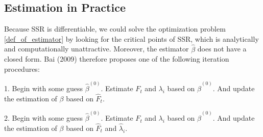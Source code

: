 \documentclass[a4paper]{article}
\begin{document}
\subsection{Estimation in Practice}

 Because SSR is differentiable, we could solve the optimization problem \eqref{def_of_estimator} by looking for the critical points of SSR, which is analytically and computationally unattractive. Moreover, the estimator $\hat \beta$ does not have a closed form. Bai (2009) therefore proposes one of the following iteration procedures:

1. Begin with some guess $\hat \beta^{(0)}$. Estimate $F_t$ and $\lambda_i$ based on $\hat \beta^{(0)}$. And update the estimation of $\beta$ based on $\hat F_t$.

2. Begin with some guess $\hat \beta^{(0)}$. Estimate $F_t$ and $\lambda_i$ based on $\hat \beta^{(0)}$. And update the estimation of $\beta$ based on $\hat F_t$ and $\hat \lambda_i$.
\end{document}
